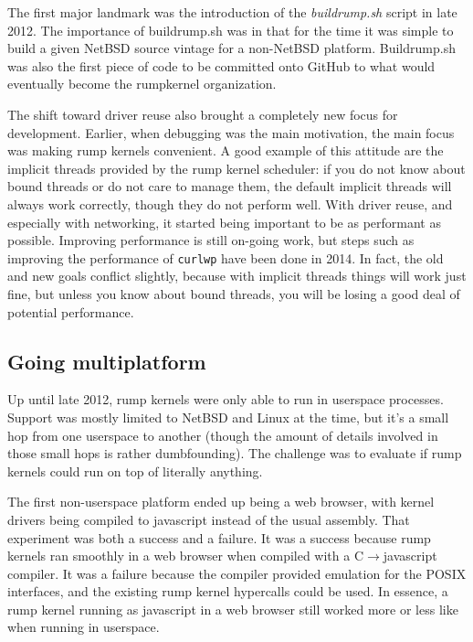 The first major landmark was the introduction of the \textit{buildrump.sh}
script in late 2012.  The importance of buildrump.sh was in that for the
time it was simple to build a given NetBSD source vintage for a non-NetBSD
platform.  Buildrump.sh was also the first piece of code to be committed
onto GitHub to what would eventually become the rumpkernel organization.

The shift toward driver reuse also brought a completely new focus
for development.  Earlier, when debugging was the main motivation,
the main focus was making rump kernels convenient.  A good example of
this attitude are the implicit threads provided by the rump kernel
scheduler: if you do not know about bound threads or do not care to
manage them, the default implicit threads will always work correctly,
though they do not perform well.  With driver reuse, and especially with
networking, it started being important to be as performant as possible.
Improving performance is still on-going work, but steps such as improving
the performance of \texttt{curlwp} have been done in 2014.  In fact,
the old and new goals conflict slightly, because with implicit threads
things will work just fine, but unless you know about bound threads,
you will be losing a good deal of potential performance.


\subsection{Going multiplatform}

Up until late 2012, rump kernels were only able to run in userspace
processes.  Support was mostly limited to NetBSD and Linux at the time,
but it's a small hop from one userspace to another (though the amount
of details involved in those small hops is rather dumbfounding).
The challenge was to evaluate if rump kernels could run on top of
literally anything.

The first non-userspace platform ended up being a web browser, with
kernel drivers being compiled to javascript instead of the usual assembly.
That experiment was both a success and a failure.  It was a success
because rump kernels ran smoothly in a web browser when compiled with a
C$\rightarrow$javascript compiler.  It was a failure because the compiler
provided emulation for the POSIX interfaces, and the existing rump kernel
hypercalls could be used.  In essence, a rump kernel running as javascript
in a web browser still worked more or less like when running in userspace.

